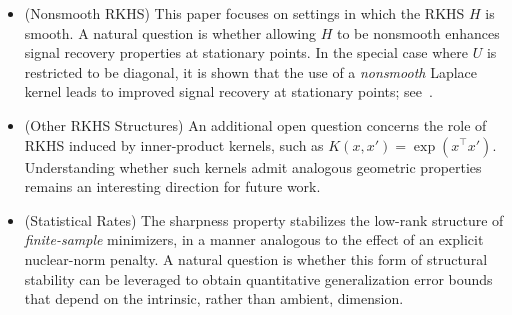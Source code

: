 \documentclass[sn-mathphys-num]{sn-jnl}%
\numberwithin{equation}{section}
\renewcommand{\P}{\mathbb{P}}
\theoremstyle{thmstyleone}%
\theoremstyle{thmstyletwo}%
\theoremstyle{thmstylethree}%
\begin{document}
\begin{itemize}
 \vspace{.5em} 
\item (Nonsmooth RKHS)
This paper focuses on settings in which the RKHS $H$ is smooth. A natural question is whether allowing $H$ to be nonsmooth enhances signal recovery properties at stationary points. In the special case where $U$ is restricted to be diagonal, it is shown that the use of a \emph{nonsmooth} Laplace kernel leads to improved signal recovery at stationary points; see~\cite{RuanLiJo25}. \vspace{.5em}
\item (Other RKHS Structures)
An additional open question concerns the role of RKHS induced by inner-product kernels, such as $K(x,x')=\exp(x^\top x')$. Understanding whether such kernels admit analogous geometric properties remains an interesting direction for future work. \vspace{.5em}
\item (Statistical Rates) 
The sharpness property stabilizes the low-rank structure of \emph{finite-sample} minimizers, in a manner analogous to the effect of an explicit nuclear-norm penalty. A natural question is whether this form of structural stability can be leveraged to obtain quantitative generalization error bounds that depend on the intrinsic, rather than ambient, dimension.


\end{itemize}
\end{document}
